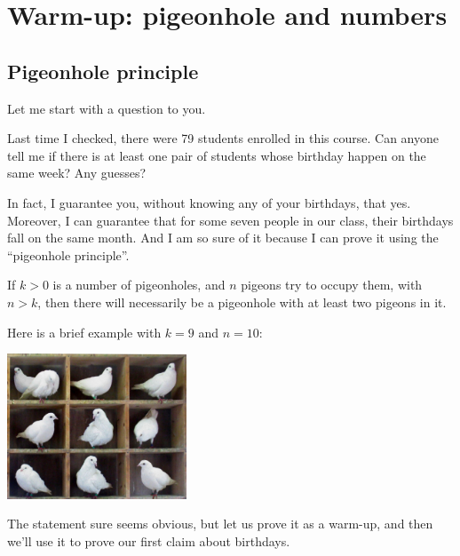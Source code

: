\chapter{Warm-up: pigeonhole and numbers}


\section{Pigeonhole principle}


Let me start with a question to you. 

\begin{exercise}
Last time I checked, there were 79 students enrolled in this course. Can anyone tell me if there is at least one pair of students whose birthday happen on the same week? Any guesses?
\end{exercise}

In fact, I guarantee you, without knowing any of your birthdays, that yes. Moreover, I can guarantee that for some seven people in our class, their birthdays fall on the same month. And I am so sure of it because I can prove it using the ``pigeonhole principle''.

\begin{theorem}
\label{thrm:pigeonhole}
If $k>0$ is a number of pigeonholes, and  $n$ pigeons try to occupy them, with $n>k$, then there will necessarily be a pigeonhole with at least two pigeons in it.
\end{theorem}

Here is a brief example with $k=9$ and $n=10$:\\
{\begin{center} 
\includegraphics[width=0.4\textwidth]{pics/pigeonhole:TooManyPigeons.jpg}
\end{center}}

The statement sure seems obvious, but let us prove it as a warm-up, and then we'll use it to prove our first claim about birthdays.

